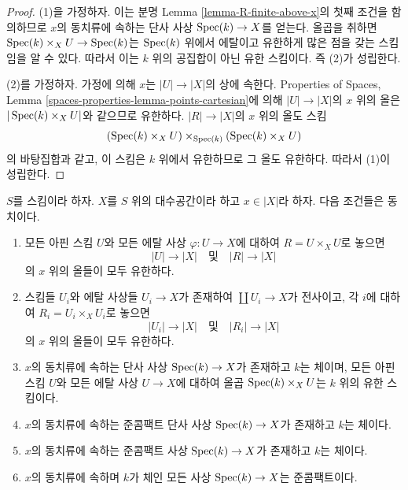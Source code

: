 \begin{proof}
(1)을 가정하자. 이는 분명 Lemma \ref{lemma-R-finite-above-x}의 첫째 조건을
함의하므로 $x$의 동치류에 속하는 단사 사상 $\mathop{\mathrm{Spec}}(k) \to X$를 얻는다.
올곱을 취하면 $\mathop{\mathrm{Spec}}(k) \times_X U \to \mathop{\mathrm{Spec}}(k)$는 $\mathop{\mathrm{Spec}}(k)$ 위에서
에탈이고 유한하게 많은 점을 갖는 스킴임을 알 수 있다. 따라서 이는
$k$ 위의 공집합이 아닌 유한 스킴이다. 즉 (2)가 성립한다.

\medskip\noindent
(2)를 가정하자. 가정에 의해 $x$는 $|U| \to |X|$의 상에 속한다.
Properties of Spaces, Lemma
\ref{spaces-properties-lemma-points-cartesian}에 의해 $|U| \to |X|$의
$x$ 위의 올은 $|\mathop{\mathrm{Spec}}(k) \times_X U|$와 같으므로 유한하다.
$|R| \to |X|$의 $x$ 위의 올도 스킴
$$
(\mathop{\mathrm{Spec}}(k) \times_X U) \times_{\mathop{\mathrm{Spec}}(k)} (\mathop{\mathrm{Spec}}(k) \times_X U)
$$
의 바탕집합과 같고, 이 스킴은 $k$ 위에서 유한하므로 그 올도 유한하다.
따라서 (1)이 성립한다.
\end{proof}

\begin{lemma}
\label{lemma-UR-finite-above-x}
$S$를 스킴이라 하자. $X$를 $S$ 위의 대수공간이라 하고
$x \in |X|$라 하자. 다음 조건들은 동치이다.
\begin{enumerate}
\item 모든 아핀 스킴 $U$와 모든 에탈 사상 $\varphi : U \to X$에 대하여
$R = U \times_X U$로 놓으면
$$
|U| \longrightarrow |X|
\quad\text{및}\quad
|R| \longrightarrow |X|
$$
의 $x$ 위의 올들이 모두 유한하다.
\item 스킴들 $U_i$와 에탈 사상들 $U_i \to X$가 존재하여
$\coprod U_i \to X$가 전사이고, 각 $i$에 대하여
$R_i = U_i \times_X U_i$로 놓으면
$$
|U_i| \longrightarrow |X|
\quad\text{및}\quad
|R_i| \longrightarrow |X|
$$
의 $x$ 위의 올들이 모두 유한하다.
\item $x$의 동치류에 속하는 단사 사상 $\mathop{\mathrm{Spec}}(k) \to X$가 존재하고
$k$는 체이며, 모든 아핀 스킴 $U$와 모든 에탈 사상 $U \to X$에 대하여
올곱 $\mathop{\mathrm{Spec}}(k) \times_X U$는 $k$ 위의 유한 스킴이다.
\item $x$의 동치류에 속하는 준콤팩트 단사 사상 $\mathop{\mathrm{Spec}}(k) \to X$가
존재하고 $k$는 체이다.
\item $x$의 동치류에 속하는 준콤팩트 사상 $\mathop{\mathrm{Spec}}(k) \to X$가
존재하고 $k$는 체이다.
\item $x$의 동치류에 속하며 $k$가 체인 모든 사상
$\mathop{\mathrm{Spec}}(k) \to X$는 준콤팩트이다.
\end{enumerate}
\end{lemma}

